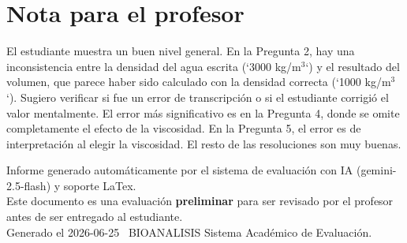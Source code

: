 \documentclass[11pt,a4paper]{article}
\begin{document}
\section*{Nota para el profesor}
\begin{tcolorbox}[
  enhanced, breakable,
  colback=yellow!8, colframe=yellow!60!black,
  fonttitle=\bfseries, coltitle=black,
  title={Observaciones para revisión manual},
  top=4pt, bottom=4pt, left=8pt, right=8pt,
]
El estudiante muestra un buen nivel general. En la Pregunta 2, hay una inconsistencia entre la densidad del agua escrita (`3000 kg/m$^{3}$`) y el resultado del volumen, que parece haber sido calculado con la densidad correcta (`1000 kg/m$^{3}$`). Sugiero verificar si fue un error de transcripción o si el estudiante corrigió el valor mentalmente. El error más significativo es en la Pregunta 4, donde se omite completamente el efecto de la viscosidad. En la Pregunta 5, el error es de interpretación al elegir la viscosidad. El resto de las resoluciones son muy buenas.
\end{tcolorbox}

\vspace{12pt}
\begin{center}
  \footnotesize\color{gray}
  Informe generado automáticamente por el sistema de evaluación con IA (gemini-2.5-flash) y soporte LaTex. \\
  Este documento es una evaluación \textbf{preliminar} para ser revisado por el profesor antes de ser entregado al 
  estudiante. \\
  Generado el 2026-06-25 \textbullet\ BIOANALISIS Sistema Académico de Evaluación.
  \end{center}
\end{document}
